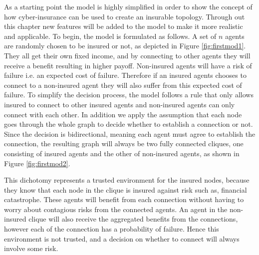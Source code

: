 As a starting point the model is highly simplified in order to show the concept of how cyber-insurance can be used to create an insurable topology. Through out this chapter new features will be added to the model to make it more realistic and applicable. To begin, the model is formulated as follows.
A set of $n$ agents are randomly chosen to be insured or not, as depicted in Figure \ref{fig:firstmod1}. They all get their own fixed income, and by connecting to other agents they will receive a benefit resulting in higher payoff. Non-insured agents will have a risk of failure i.e. an expected cost of failure. Therefore if an insured agents chooses to connect to a non-insured agent they will also suffer from this expected cost of failure. To simplify the decision process, the model follows a rule that only allows insured to connect to other insured agents and non-insured agents can only connect with each other. In addition we apply the assumption that each node goes through the whole graph to decide whether to establish a connection or not. Since the decision is bidirectional, meaning each agent must agree to establish the connection, the resulting graph will always be two fully connected cliques, one consisting of insured agents and the other of non-insured agents, as shown in Figure  \ref{fig:firstmod2}. 


This dichotomy represents a trusted environment for the insured nodes, because they know that each node in the clique is insured against risk such as, financial catastrophe. These agents will benefit from each connection without having to worry about contagious risks from the connected agents. 
An agent in the non-insured clique will also receive the aggregated benefits from the connections, however each of the connection has a probability of failure. Hence this environment is not trusted, and a decision on whether to connect will always involve some risk. 

